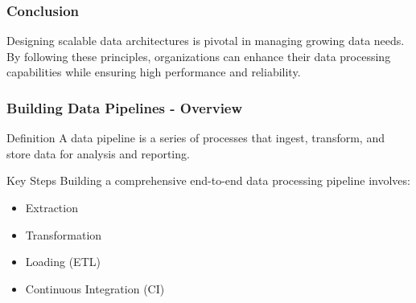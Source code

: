 \documentclass{beamer}
\begin{document}
\begin{frame}[fragile]
    \frametitle{Conclusion}
    Designing scalable data architectures is pivotal in managing growing data needs. By following these principles, organizations can enhance their data processing capabilities while ensuring high performance and reliability.
\end{frame}

\begin{frame}[fragile]
    \frametitle{Building Data Pipelines - Overview}
    \begin{block}{Definition}
        A data pipeline is a series of processes that ingest, transform, and store data for analysis and reporting.
    \end{block}
    \begin{block}{Key Steps}
        Building a comprehensive end-to-end data processing pipeline involves:
        \begin{itemize}
            \item Extraction
            \item Transformation
            \item Loading (ETL)
            \item Continuous Integration (CI)
        \end{itemize}
    \end{block}
\end{frame}
\end{document}
